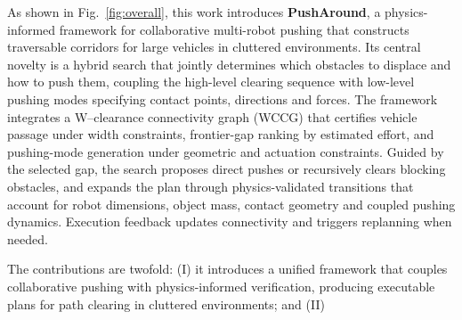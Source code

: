 As shown in Fig.~\ref{fig:overall}, this work introduces \textbf{PushAround},
a physics-informed framework for collaborative multi-robot pushing that
constructs traversable corridors for large vehicles in cluttered environments.
Its central novelty is a hybrid search that jointly determines which obstacles
to displace and how to push them, coupling the high-level clearing sequence
with low-level pushing modes specifying contact points, directions and forces.
The framework integrates a W--clearance connectivity graph (WCCG) that certifies
vehicle passage under width constraints, frontier-gap ranking by estimated
effort, and pushing-mode generation under geometric and actuation constraints.
Guided by the selected gap, the search proposes direct pushes or recursively
clears blocking obstacles, and expands the plan through physics-validated
transitions that account for robot dimensions, object mass, contact geometry
and coupled pushing dynamics. Execution feedback updates connectivity and
triggers replanning when needed.



The contributions are twofold: {(I)} it introduces a unified framework that
couples collaborative pushing with physics-informed verification, 
producing executable plans for path clearing in cluttered environments; 
and {(II)} 
